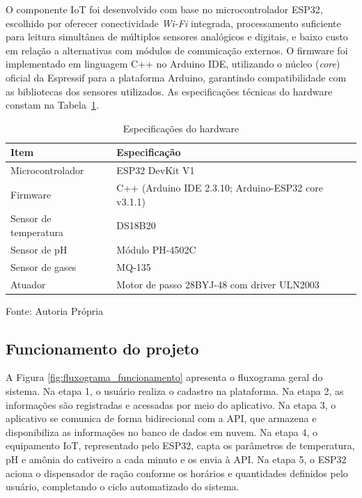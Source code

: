 \documentclass[11pt,a4paper]{article}
\begin{document}
O componente IoT foi desenvolvido com base no microcontrolador ESP32, escolhido por oferecer conectividade \textit{Wi-Fi} integrada, processamento suficiente para leitura simultânea de múltiplos sensores analógicos e digitais, e baixo custo em relação a alternativas com módulos de comunicação externos. O firmware foi implementado em linguagem C++ no Arduino IDE, utilizando o núcleo (\textit{core}) oficial da Espressif para a plataforma Arduino, garantindo compatibilidade com as bibliotecas dos sensores utilizados. As especificações técnicas do hardware constam na Tabela~\ref{tab:ambiente-testes}.
 
\begin{table}[H]
\centering
\caption{Especificações do hardware}
\label{tab:ambiente-testes}
\begin{tabular}{|l|l|}
\hline
\textbf{Item} & \textbf{Especificação} \\
\hline
Microcontrolador & ESP32 DevKit V1 \\
\hline
Firmware & C++ (Arduino IDE 2.3.10; Arduino-ESP32 core v3.1.1) \\
\hline
Sensor de temperatura & DS18B20 \\
\hline
Sensor de pH & Módulo PH-4502C \\
\hline
Sensor de gases & MQ-135 \\
\hline
Atuador & Motor de passo 28BYJ-48 com driver ULN2003 \\
\hline
\end{tabular}
 
\vspace{2mm}
{\small Fonte: Autoria Própria}
\end{table}

\subsection{Funcionamento do projeto}
 
A Figura \ref{fig:fluxograma_funcionamento} apresenta o fluxograma geral do sistema. Na etapa 1, o usuário realiza o cadastro na plataforma. Na etapa 2, as informações são registradas e acessadas por meio do aplicativo. Na etapa 3, o aplicativo se comunica de forma bidirecional com a API, que armazena e disponibiliza as informações no banco de dados em nuvem. Na etapa 4, o equipamento IoT, representado pelo ESP32, capta os parâmetros de temperatura, pH e amônia do cativeiro a cada minuto e os envia à API. Na etapa 5, o ESP32 aciona o dispensador de ração conforme os horários e quantidades definidos pelo usuário, completando o ciclo automatizado do sistema.
 
\end{document}
